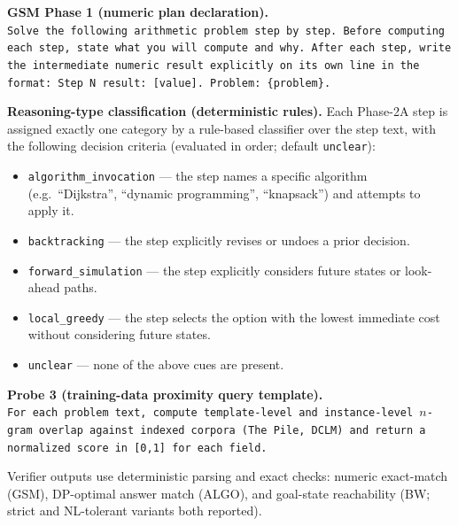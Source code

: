 \textbf{GSM Phase 1 (numeric plan declaration).}\\
\texttt{Solve the following arithmetic problem step by step. Before computing
each step, state what you will compute and why. After each step, write the
intermediate numeric result explicitly on its own line in the format: Step N
result: [value]. Problem: \{problem\}.}

\textbf{Reasoning-type classification (deterministic rules).} Each Phase-2A
step is assigned exactly one category by a rule-based classifier over the step
text, with the following decision criteria (evaluated in order; default
\texttt{unclear}):
\begin{itemize}
  \item \texttt{algorithm\_invocation} --- the step names a specific algorithm
  (e.g.\ ``Dijkstra'', ``dynamic programming'', ``knapsack'') and attempts to
  apply it.
  \item \texttt{backtracking} --- the step explicitly revises or undoes a prior
  decision.
  \item \texttt{forward\_simulation} --- the step explicitly considers future
  states or look-ahead paths.
  \item \texttt{local\_greedy} --- the step selects the option with the lowest
  immediate cost without considering future states.
  \item \texttt{unclear} --- none of the above cues are present.
\end{itemize}

\textbf{Probe 3 (training-data proximity query template).}\\
\texttt{For each problem text, compute template-level and instance-level
$n$-gram overlap against indexed corpora (The Pile, DCLM) and return a
normalized score in [0,1] for each field.}

Verifier outputs use deterministic parsing and exact checks: numeric
exact-match (GSM), DP-optimal answer match (ALGO), and goal-state reachability
(BW; strict and NL-tolerant variants both reported).


